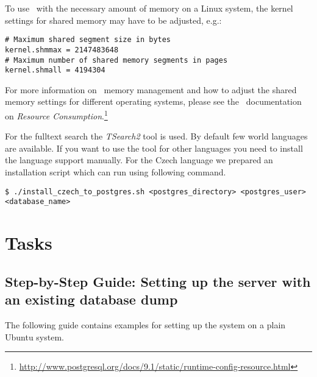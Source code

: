 To use \postgres~with the necessary amount of memory on a Linux system, the kernel settings for shared memory may have to be adjusted, e.g.:

\vspace*{0.5em}
\begin{lstlisting}
# Maximum shared segment size in bytes
kernel.shmmax = 2147483648
# Maximum number of shared memory segments in pages
kernel.shmall = 4194304
\end{lstlisting}
\vspace*{0.5em}

For more information on \postgres~memory management and how to adjust the shared memory settings for different operating systems, please see the \postgres~documentation on \emph{Resource Consumption}.\footnote{\url{http://www.postgresql.org/docs/9.1/static/runtime-config-resource.html}}

For the fulltext search the \emph{TSearch2} tool is used. By default few world languages are available. If you want to use the tool for other languages you need to install the language support manually. For the Czech language we prepared an installation script which can run using following command.

\vspace*{0.5em}
\begin{lstlisting}
$ ./install_czech_to_postgres.sh <postgres_directory> <postgres_user> <database_name>
\end{lstlisting}
\vspace*{0.5em}


\section{Tasks}

\subsection{Step-by-Step Guide: Setting up the server with an existing database dump}

The following guide contains examples for setting up the system on a plain Ubuntu system.

